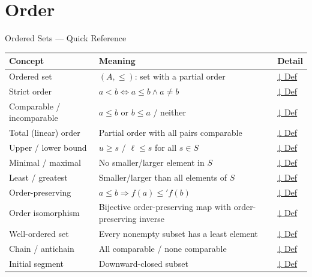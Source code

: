 \section{Order}

%

\begin{toolkitbox}{Ordered Sets — Quick Reference}
\small
\begin{tabular}{l l l}
\toprule
\textbf{Concept} & \textbf{Meaning} & \textbf{Detail} \\
\midrule
Ordered set        & $(A, \leq)$: set with a partial order                        & \hyperref[def:ordered-set]{↓ Def} \\
Strict order       & $a < b \iff a \leq b \land a \neq b$                         & \hyperref[def:strict-order]{↓ Def} \\
Comparable / incomparable & $a \leq b$ or $b \leq a$ / neither              & \hyperref[def:comparable]{↓ Def} \\
Total (linear) order & Partial order with all pairs comparable                  & \hyperref[def:linear-order]{↓ Def} \\
Upper / lower bound & $u \geq s$ / $\ell \leq s$ for all $s \in S$               & \hyperref[def:bounds]{↓ Def} \\
Minimal / maximal  & No smaller/larger element in $S$                            & \hyperref[def:min-max]{↓ Def} \\
Least / greatest   & Smaller/larger than all elements of $S$                     & \hyperref[def:least-greatest]{↓ Def} \\
Order-preserving   & $a \leq b \Rightarrow f(a) \leq' f(b)$                       & \hyperref[def:order-pres]{↓ Def} \\
Order isomorphism  & Bijective order-preserving map with order-preserving inverse & \hyperref[def:order-iso]{↓ Def} \\
Well-ordered set   & Every nonempty subset has a least element                   & \hyperref[def:well-order]{↓ Def} \\
Chain / antichain  & All comparable / none comparable                            & \hyperref[def:chain]{↓ Def} \\
Initial segment    & Downward-closed subset                                      & \hyperref[def:initial-segment]{↓ Def} \\
\bottomrule
\end{tabular}
\end{toolkitbox}

